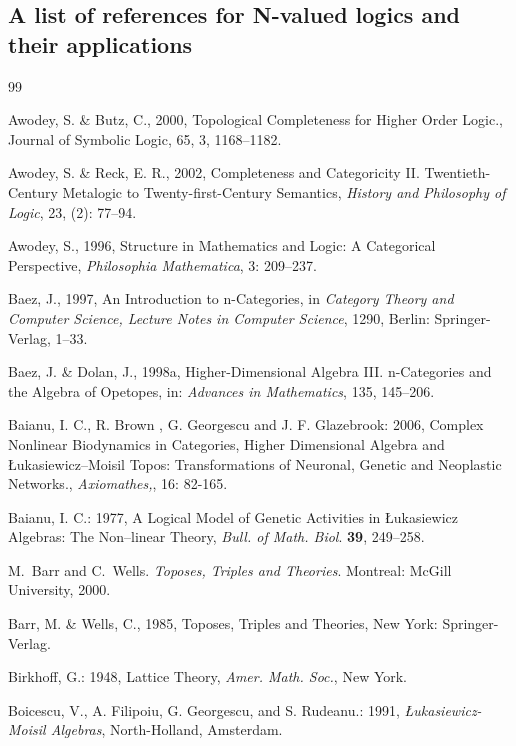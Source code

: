 \documentclass[12pt]{article}
\theoremstyle{plain}
\theoremstyle{definition}
\begin{document}
\subsection{A list of references for N-valued logics and their applications}

\begin{thebibliography} {99}

Awodey, S. \& Butz, C., 2000, Topological Completeness for Higher Order Logic., Journal of Symbolic Logic, 65, 3, 1168--1182.

Awodey, S. \& Reck, E. R., 2002, Completeness and Categoricity II. Twentieth-Century Metalogic to Twenty-first-Century Semantics, \emph{History and Philosophy of Logic}, 23, (2): 77--94.

Awodey, S., 1996, Structure in Mathematics and Logic: A Categorical Perspective,
\emph{Philosophia Mathematica}, 3: 209--237.

Baez, J., 1997, An Introduction to n-Categories, in \emph{Category Theory and Computer Science, Lecture Notes in Computer Science}, 1290, Berlin: Springer-Verlag, 1--33.

Baez, J. \& Dolan, J., 1998a, Higher-Dimensional Algebra III. n-Categories and the Algebra of Opetopes,
in: \emph{Advances in Mathematics}, 135, 145--206.

Baianu, I. C., R. Brown , G. Georgescu and J. F. Glazebrook:  2006, Complex Nonlinear Biodynamics in
Categories, Higher Dimensional Algebra and \L ukasiewicz--Moisil Topos: Transformations of Neuronal, Genetic and
Neoplastic Networks., \emph{Axiomathes,}, 16: 82-165.

Baianu, I. C.: 1977, A Logical Model of Genetic Activities in \L{}ukasiewicz Algebras: The Non--linear Theory,
\emph{Bull. of Math. Biol}. \textbf{39}, 249--258.

M.~Barr and C.~Wells. {\em Toposes, Triples and Theories}. Montreal: McGill University, 2000.

Barr, M. \& Wells, C., 1985, Toposes, Triples and Theories, New York: Springer-Verlag.

Birkhoff, G.: 1948, Lattice Theory, {\em Amer. Math. Soc.}, New York.

Boicescu, V., A. Filipoiu, G. Georgescu, and S. Rudeanu.: 1991, \emph{\L{}ukasiewicz-Moisil Algebras},
North-Holland, Amsterdam.


\end{thebibliography}
\end{document}
